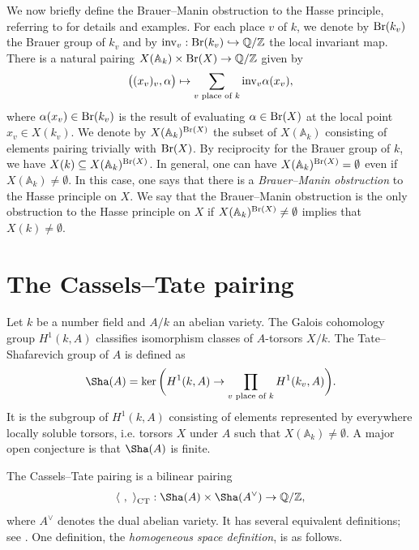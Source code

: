 \documentclass[10pt]{amsart}
\numberwithin{equation}{section}
\theoremstyle{remark}
\theoremstyle{definition}
\theoremstyle{definition}
\theoremstyle{definition}
\theoremstyle{definition}
\theoremstyle{definition}
\theoremstyle{definition}
\theoremstyle{definition}
\theoremstyle{definition}
\begin{document}
We now briefly define the Brauer--Manin obstruction to the Hasse principle, referring to \cite[Chapter 12]{ctsko21} for details and examples. For each place $v$ of $k$, we denote by $\textup{Br}(k_v)$ the Brauer group of $k_v$ and by $\textup{inv}_v:\textup{Br}(k_v)\hookrightarrow \mathbb{Q}/\mathbb{Z}$ the local invariant map. There is a natural pairing 
$X(\mathbb{A}_k)\times \textup{Br}(X)\to \mathbb{Q}/\mathbb{Z}$
given by 
\[\big((x_v)_v,\alpha\big)\mapsto \sum_{v\textup{ place of }k}\textup{inv}_v\alpha(x_v),\]
where $\alpha(x_v)\in \textup{Br}(k_v)$ is the result of evaluating $\alpha \in\textup{Br}(X)$ at the local point $x_v\in  X(k_v)$. We denote by $X(\mathbb{A}_k)^{\textup{Br}(X)}$ the subset of $X(\mathbb{A}_k)$ consisting of elements pairing trivially with $\textup{Br}(X)$. By reciprocity for the Brauer group of $k$, we have $X(k)\subseteq X(\mathbb{A}_k)^{\textup{Br}(X)}$. In general, one can have $ X(\mathbb{A}_k)^{\textup{Br}(X)}=\emptyset$ even if $X(\mathbb{A}_k)\neq \emptyset$. In this case, one says that there is a \textit{Brauer--Manin obstruction} to the Hasse principle on $X$. We say that the Brauer--Manin obstruction is the only obstruction to the Hasse principle on $X$ if $X(\mathbb{A}_k)^{\textup{Br}(X)}\neq \emptyset$ implies that $X(k)\neq \emptyset$.  

\section{The Cassels--Tate pairing}

Let $k$ be a number field and $A/k$ an abelian variety. The Galois cohomology group $H^1(k,A)$ classifies isomorphism classes of $A$-torsors $X/k$. The Tate--Shafarevich group of $A$ is defined as
\[\Sha(A)=\ker\bigg(H^1(k,A)\to \prod_{v\textup{ place of }k}H^1(k_v,A)\bigg).\]
It is the subgroup of $H^1(k,A)$ consisting of elements represented by everywhere locally soluble torsors, i.e. torsors $X$ under $A$ such that $X(\mathbb{A}_k)\neq \emptyset$. A major open conjecture is that $\Sha(A)$ is finite. 

The Cassels--Tate pairing is a bilinear pairing 
\[\left \langle ~,~\right \rangle_{\textup{CT}}:\Sha(A)\times \Sha(A^\vee)\to \mathbb{Q}/\mathbb{Z},\]
where $A^\vee$ denotes the dual abelian variety. 
It has several equivalent definitions; see \cite{MR1740984}. One definition, the \textit{homogeneous space definition}, is as follows. 
\end{document}
